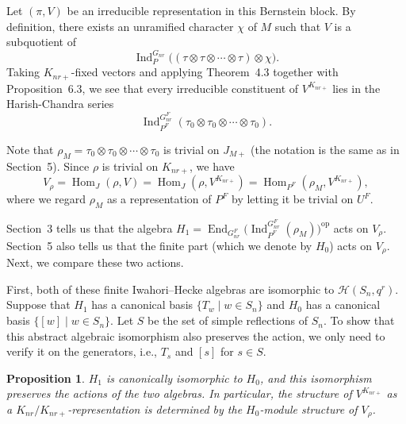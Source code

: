 \documentclass[12pt]{article}
\newtheorem{proposition}[theorem]{Proposition}
\theoremstyle{remark}
\begin{document}
Let $(\pi,V)$ be an irreducible representation in this Bernstein block. By definition, there exists an unramified character $\chi$ of $M$ such that $V$ is a subquotient of
$$
\operatorname{Ind}_P^{G_{nr}} \bigl( (\tau \otimes \tau \otimes \cdots \otimes \tau ) \otimes \chi \bigr).
$$
Taking $K_{nr+}$-fixed vectors and applying Theorem~4.3 together with Proposition~6.3, we see that every irreducible constituent of $V^{K_{nr+}}$ lies in the Harish-Chandra series
$$
\operatorname{Ind}_{P^F}^{G_{nr}^F} (\tau_0 \otimes \tau_0 \otimes \cdots \otimes \tau_0).
$$

Note that $\rho_M = \tau_0 \otimes \tau_0 \otimes \cdots \otimes \tau_0$ is trivial on $J_{M+}$ (the notation is the same as in Section~5). Since $\rho$ is trivial on $K_{nr+}$, we have
$$
V_{\rho} = \operatorname{Hom}_J(\rho, V) = \operatorname{Hom}_J(\rho, V^{K_{nr+}}) = \operatorname{Hom}_{P^F}(\rho_M, V^{K_{nr+}}),
$$
where we regard $\rho_M$ as a representation of $P^F$ by letting it be trivial on $U^F$.

Section~3 tells us that the algebra $H_1 = \operatorname{End}_{G_{nr}^F}\bigl(\operatorname{Ind}_{P^F}^{G_{nr}^F}(\rho_M)\bigr)^{\mathrm{op}}$ acts on $V_{\rho}$. Section~5 also tells us that the finite part (which we denote by $H_0$) acts on $V_\rho$. Next, we compare these two actions.

First, both of these finite Iwahori--Hecke algebras are isomorphic to $\mathcal{H}(S_n, q^r)$. Suppose that $H_1$ has a canonical basis $\{ T_w \mid w \in S_n \}$ and $H_0$ has a canonical basis $\{ [w] \mid w \in S_n \}$. Let $S$ be the set of simple reflections of $S_n$. To show that this abstract algebraic isomorphism also preserves the action, we only need to verify it on the generators, i.e., $T_s$ and $[s]$ for $s \in S$.

\begin{proposition}
$H_1$ is canonically isomorphic to $H_0$, and this isomorphism preserves the actions of the two algebras. In particular, the structure of $V^{K_{nr+}}$ as a $K_{nr}/K_{nr+}$-representation is determined by the $H_0$-module structure of $V_\rho$.
\end{proposition}
\end{document}
